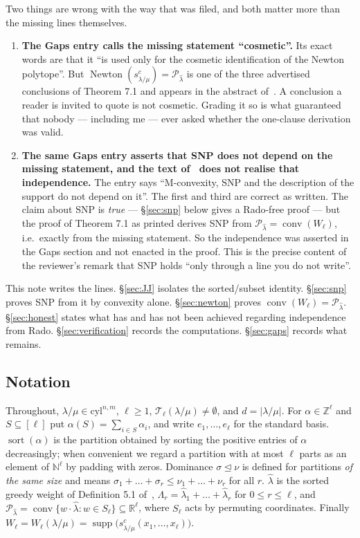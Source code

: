 \documentclass[11pt]{article}
\theoremstyle{plain}
\theoremstyle{definition}
\DeclareMathOperator{\supp}{supp}
\DeclareMathOperator{\Newton}{Newton}
\DeclareMathOperator{\conv}{conv}
\DeclareMathOperator{\srt}{sort}
\newcommand{\N}{\mathbb{N}}
\newcommand{\Z}{\mathbb{Z}}
\newcommand{\R}{\mathbb{R}}
\newcommand{\cyl}{\mathrm{cyl}}
\newcommand{\lhat}{\hat\lambda}
\newcommand{\Perm}{\mathcal{P}}
\begin{document}
Two things are wrong with the way that was filed, and both matter more than the
missing lines themselves.

\begin{enumerate}
\item \textbf{The Gaps entry calls the missing statement ``cosmetic''.} Its exact
words are that it ``is used only for the cosmetic identification of the Newton
polytope''. But $\Newton(s^{c}_{\lambda/\mu})=\Perm_{\lhat}$ is one of the three
advertised conclusions of Theorem 7.1 and appears in the abstract of~\cite{note1}.
A conclusion a reader is invited to quote is not cosmetic. Grading it so is what
guaranteed that nobody --- including me --- ever asked whether the one-clause
derivation was valid.
\item \textbf{The same Gaps entry asserts that SNP does not depend on the missing
statement, and the text of~\cite{note1} does not realise that independence.}
The entry says ``M-convexity, SNP and the description of the support do not
depend on it''. The first and third are correct as written. The claim about SNP
is \emph{true} --- \S\ref{sec:snp} below gives a Rado-free proof --- but the
proof of Theorem 7.1 as printed derives SNP from
$\Perm_{\lhat}=\conv(W_\ell)$, i.e.\ exactly from the missing statement. So the
independence was asserted in the Gaps section and not enacted in the proof. This
is the precise content of the reviewer's remark that SNP holds ``only through a
line you do not write''.
\end{enumerate}

This note writes the lines. \S\ref{sec:JJ} isolates the sorted/subset identity.
\S\ref{sec:snp} proves SNP from it by convexity alone. \S\ref{sec:newton} proves
$\conv(W_\ell)=\Perm_{\lhat}$. \S\ref{sec:honest} states what has and has not
been achieved regarding independence from Rado. \S\ref{sec:verification} records
the computations. \S\ref{sec:gaps} records what remains.

\subsection*{Notation}
Throughout, $\lambda/\mu\in\cyl^{n,m}$, $\ell\ge 1$,
$\mathcal{T}_\ell(\lambda/\mu)\ne\emptyset$, and $d=|\lambda/\mu|$. For
$\alpha\in\Z^{\ell}$ and $S\subseteq[\ell]$ put $\alpha(S)=\sum_{i\in S}\alpha_i$,
and write $e_1,\dots,e_\ell$ for the standard basis. $\srt(\alpha)$ is the
partition obtained by sorting the positive entries of $\alpha$ decreasingly;
when convenient we regard a partition with at most $\ell$ parts as an element of
$\N^{\ell}$ by padding with zeros. Dominance $\sigma\trianglelefteq\nu$ is
defined for partitions \emph{of the same size} and means
$\sigma_1+\dots+\sigma_r\le\nu_1+\dots+\nu_r$ for all $r$. $\lhat$ is the sorted
greedy weight of Definition 5.1 of~\cite{note1},
$\Lambda_r=\lhat_1+\dots+\lhat_r$ for $0\le r\le\ell$, and
$\Perm_{\lhat}=\conv\{w\cdot\lhat : w\in S_\ell\}\subseteq\R^{\ell}$, where
$S_\ell$ acts by permuting coordinates. Finally
$W_\ell=W_\ell(\lambda/\mu)=\supp\bigl(s^{c}_{\lambda/\mu}(x_1,\dots,x_\ell)\bigr)$.
\end{document}
